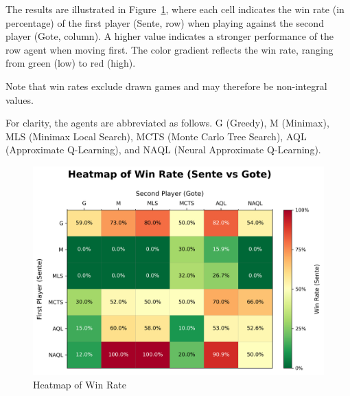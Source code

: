 The results are illustrated in Figure~\ref{fig:heatmap}, where each cell indicates the win rate (in percentage) of the first player (Sente, row) when playing against the second player (Gote, column). A higher value indicates a stronger performance of the row agent when moving first. The color gradient reflects the win rate, ranging from green (low) to red (high).

Note that win rates exclude drawn games and may therefore be non-integral values.

For clarity, the agents are abbreviated as follows. G (Greedy), M (Minimax), MLS (Minimax Local Search), MCTS (Monte Carlo Tree Search), AQL (Approximate Q-Learning), and NAQL (Neural Approximate Q-Learning).

\begin{figure}[h]
    \centering
    \includegraphics[width=1\columnwidth]{figures/win_rate_heatmap.png}
    \caption{Heatmap of Win Rate}
    \label{fig:heatmap}
\end{figure}